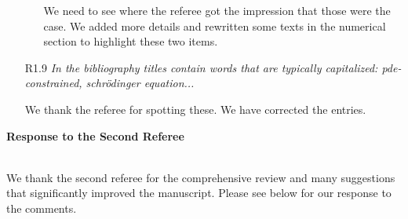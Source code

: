 \documentclass[11pt]{article}
\newcommand{\mycomment}[1]{\textit{\color{bluey}#1}}
\newcommand{\red}[1]{\textcolor{red}{#1}}
\begin{document}
\begin{enumerate}[parsep=1em,leftmargin=1em]
\begin{itemize}
 We need to see where the referee got the impression that those were the case. We added more details and rewritten some texts in the numerical section to highlight these two items.

\end{itemize}

\item[R1.9] \mycomment{In the bibliography titles contain words that are typically capitalized: pde-constrained, schr\"odinger equation...}


We thank the referee for spotting these. We have corrected the entries.

\end{enumerate}

\newpage

\centerline{\textbf{{\large Response to the Second Referee}}}
\ \\
We thank the second referee for the comprehensive review and many suggestions that significantly improved the manuscript. Please see below for our response to the comments. 
\end{document}
